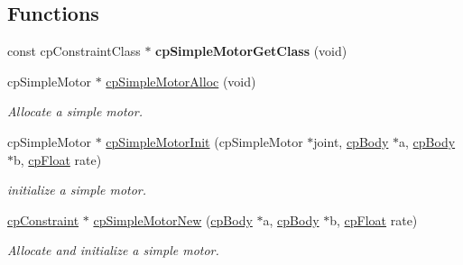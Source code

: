 \subsection*{Functions}
\begin{DoxyCompactItemize}
\item 
\hypertarget{group__cp_simple_motor_ga0874ed90952d2e50db361f65388a148e}{const cp\-Constraint\-Class $\ast$ {\bfseries cp\-Simple\-Motor\-Get\-Class} (void)}\label{group__cp_simple_motor_ga0874ed90952d2e50db361f65388a148e}

\item 
\hypertarget{group__cp_simple_motor_ga4b97807c9c82377912fc7f40745c949c}{cp\-Simple\-Motor $\ast$ \hyperlink{group__cp_simple_motor_ga4b97807c9c82377912fc7f40745c949c}{cp\-Simple\-Motor\-Alloc} (void)}\label{group__cp_simple_motor_ga4b97807c9c82377912fc7f40745c949c}

\begin{DoxyCompactList}\small\item\em Allocate a simple motor. \end{DoxyCompactList}\item 
\hypertarget{group__cp_simple_motor_ga46771f0e76cc15df8b9f9832ddd0b1d5}{cp\-Simple\-Motor $\ast$ \hyperlink{group__cp_simple_motor_ga46771f0e76cc15df8b9f9832ddd0b1d5}{cp\-Simple\-Motor\-Init} (cp\-Simple\-Motor $\ast$joint, \hyperlink{structcp_body}{cp\-Body} $\ast$a, \hyperlink{structcp_body}{cp\-Body} $\ast$b, \hyperlink{group__basic_types_gac1ed65573e035bf892505768c852d8d3}{cp\-Float} rate)}\label{group__cp_simple_motor_ga46771f0e76cc15df8b9f9832ddd0b1d5}

\begin{DoxyCompactList}\small\item\em initialize a simple motor. \end{DoxyCompactList}\item 
\hypertarget{group__cp_simple_motor_ga66c3053590bd2166ed3ddb6e08fe1bf5}{\hyperlink{structcp_constraint}{cp\-Constraint} $\ast$ \hyperlink{group__cp_simple_motor_ga66c3053590bd2166ed3ddb6e08fe1bf5}{cp\-Simple\-Motor\-New} (\hyperlink{structcp_body}{cp\-Body} $\ast$a, \hyperlink{structcp_body}{cp\-Body} $\ast$b, \hyperlink{group__basic_types_gac1ed65573e035bf892505768c852d8d3}{cp\-Float} rate)}\label{group__cp_simple_motor_ga66c3053590bd2166ed3ddb6e08fe1bf5}

\begin{DoxyCompactList}\small\item\em Allocate and initialize a simple motor. \end{DoxyCompactList}\end{DoxyCompactItemize}
